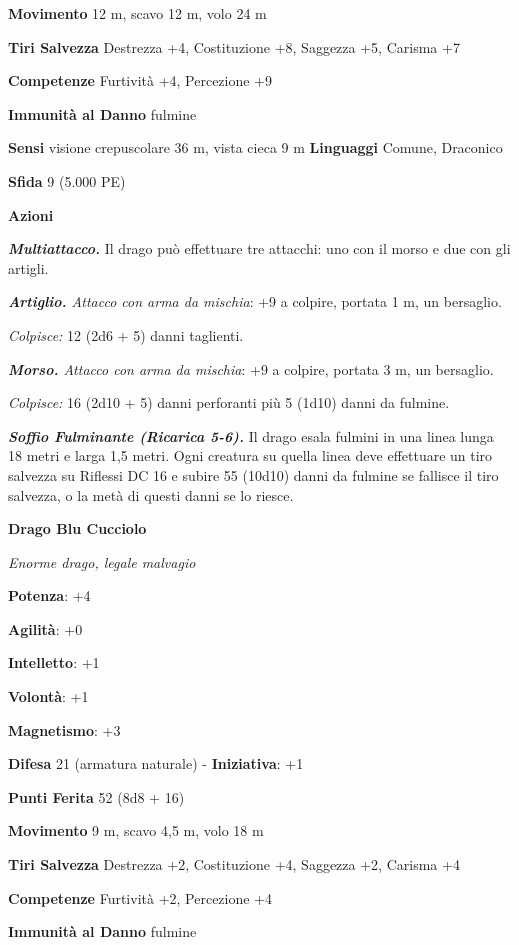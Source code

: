 \begin{multicols}{2}
\textbf{Movimento} 12 m, scavo 12 m, volo 24 m

\textbf{Tiri Salvezza} Destrezza +4, Costituzione +8, Saggezza +5,
Carisma +7

\textbf{Competenze} Furtività +4, Percezione +9

\textbf{Immunità al Danno} fulmine

\textbf{Sensi} visione crepuscolare 36 m, vista cieca 9 m
\textbf{Linguaggi} Comune, Draconico

\textbf{Sfida} 9 (5.000 PE)\smallskip

\smallskip\textbf{Azioni}

\emph{\textbf{Multiattacco.}} Il drago può effettuare tre attacchi: uno
con il morso e due con gli artigli.

\emph{\textbf{Artiglio.} Attacco con arma da mischia}: +9 a colpire,
portata 1 m, un bersaglio.

\emph{Colpisce:} 12 (2d6 + 5) danni taglienti.

\emph{\textbf{Morso.} Attacco con arma da mischia}: +9 a colpire,
portata 3 m, un bersaglio.

\emph{Colpisce:} 16 (2d10 + 5) danni perforanti più 5 (1d10) danni da
fulmine.

\emph{\textbf{Soffio Fulminante (Ricarica 5-6).}} Il drago esala fulmini
in una linea lunga 18 metri e larga 1,5 metri. Ogni creatura su quella
linea deve effettuare un tiro salvezza su Riflessi DC 16 e subire 55
(10d10) danni da fulmine se fallisce il tiro salvezza, o la metà di
questi danni se lo riesce.

\textbf{Drago Blu Cucciolo}

\emph{Enorme drago, legale malvagio}

\textbf{Potenza}: +4

\textbf{Agilità}: +0

\textbf{Intelletto}: +1

\textbf{Volontà}: +1

\textbf{Magnetismo}: +3

\textbf{Difesa} 21 (armatura naturale) - \textbf{Iniziativa}: +1

\textbf{Punti Ferita} 52 (8d8 + 16)

\textbf{Movimento} 9 m, scavo 4,5 m, volo 18 m

\textbf{Tiri Salvezza} Destrezza +2, Costituzione +4, Saggezza +2,
Carisma +4

\textbf{Competenze} Furtività +2, Percezione +4

\textbf{Immunità al Danno} fulmine


\end{multicols}
